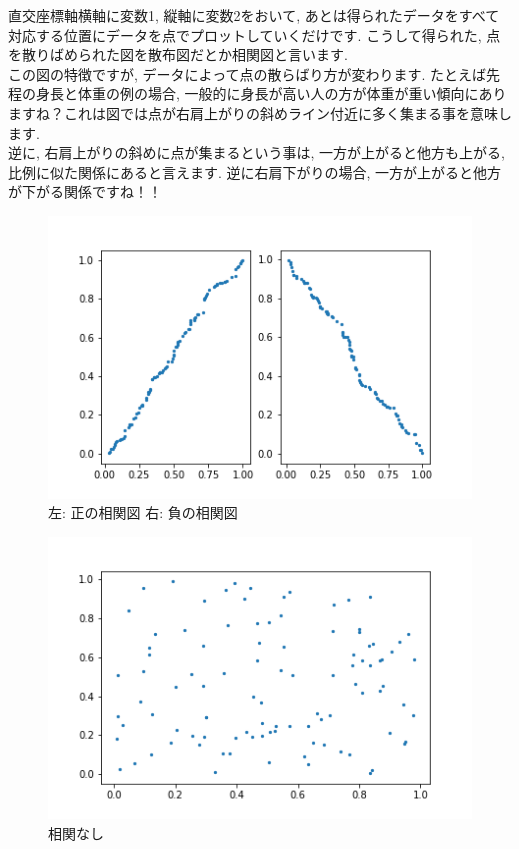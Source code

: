 \documentclass[11pt,a4paper]{jreport}
\begin{document}
直交座標軸横軸に変数1, 縦軸に変数2をおいて, あとは得られたデータをすべて対応する位置にデータを点でプロットしていくだけです. こうして得られた, 点を散りばめられた図を散布図だとか相関図と言います.\\
この図の特徴ですが, データによって点の散らばり方が変わります. たとえば先程の身長と体重の例の場合, 一般的に身長が高い人の方が体重が重い傾向にありますね？これは図では点が右肩上がりの斜めライン付近に多く集まる事を意味します. \\
逆に, 右肩上がりの斜めに点が集まるという事は, 一方が上がると他方も上がる, 比例に似た関係にあると言えます. 逆に右肩下がりの場合, 一方が上がると他方が下がる関係ですね！！\\

\begin{figure}[H]
\label{im:scatter1}
  \centering
  \includegraphics[width=120mm,bb=0 0 432 288]{../figures/scatter1.png}
  \caption{左: 正の相関図 右: 負の相関図}
\end{figure}

\begin{figure}[H]
\label{im:scatter2}
  \centering
  \includegraphics[width=120mm,bb=0 0 432 288]{../figures/scatter2.png}
  \caption{相関なし}
\end{figure}
\end{document}
